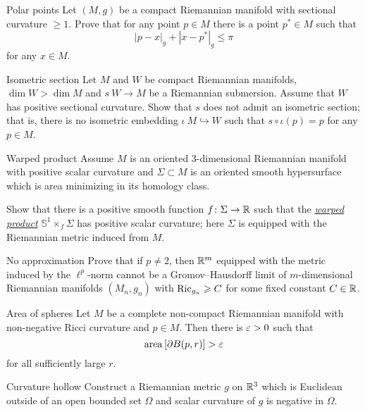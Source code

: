 \documentclass[twoside]{book}
\begin{document}
\begin{pr}{\many}{Polar points} \label{milka-polar} Let $(M,g)$ be a compact Riemannian manifold with sectional curvature $\ge 1$. 
Prove that for any point $p\in M$ there is a point $p^*\in M$ such that 
\[|p-x|_g+|x-p^*|_g\le \pi\]
for any $x\in M$.
\end{pr}

\begin{pr}{\hard}{Isometric section}\label{Isometric section}
Let $M$ and $W$ be compact Riemannian manifolds,
$\dim W>\dim M$
and $s\:W\to M$ be a Riemannian submersion.
Assume that $W$ has positive sectional curvature.
Show that $s$ does not admit an isometric section;
that is, there is no isometric embedding $\iota\:M\hookrightarrow W$ such that $s\circ\iota(p)=p$ for any $p\in M$.
\end{pr}

\begin{pr}{}{Warped product}\label{Warped product}
Assume $M$ is an oriented 3-dimensional Riemannian manifold with positive scalar curvature 
and $\Sigma\subset M$ is an oriented smooth hypersurface which is area minimizing in its homology class.

Show that there is a positive smooth function $f\colon\Sigma\to \mathbb{R}$
such that the \hyperref[def:Warped product]{\emph{warped product}} $\mathbb S^1\times_f \Sigma$
has positive scalar curvature;
here $\Sigma$ is equipped with the Riemannian metric
induced from $M$.
\end{pr}



\begin{pr}{\many}{No approximation}\label{No approximation}
Prove that 
if $p\not=2$,
then $\mathbb{R}^m$ 
equipped with the metric induced by the $\ell^p$-norm 
cannot be a
Gromov--Hausdorff limit of
$m$-dimensional Riemannian manifolds $(M_n,g_n)$ with $\Ric_{g_n}\z\ge C$ for some fixed constant $C\in\mathbb{R}$.
\end{pr}


\begin{pr}{}{Area of spheres}\label{Area of spheres}
Let $M$ be a complete non-compact Riemannian manifold 
with non-negative Ricci curvature and $p\in M$.
Then there is $\varepsilon>0$ such that 
$$\operatorname{\rm area}\left[\partial B(p,r)\right]>\varepsilon$$
for all sufficiently large $r$.
\end{pr}

\begin{pr}{}{Curvature hollow}\label{Curvature hollow}
Construct a Riemannian metric $g$ on $\mathbb{R}^3$ 
which is Euclidean outside of an open bounded set $\Omega$ 
and scalar curvature of $g$ is negative in $\Omega$.
\end{pr}
\end{document}
